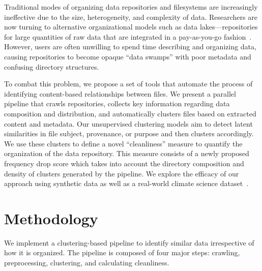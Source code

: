 \documentclass[sigconf,screen]{acmart}
\begin{document}
Traditional modes of organizing data repositories and filesystems are increasingly ineffective due to the size, heterogeneity, and complexity of data. Researchers are now turning to alternative organizational models such as data lakes---repositories for large quantities of raw data that are integrated in a pay-as-you-go fashion~\cite{jeffery2008pay, madhavan2007web}. However, users are often unwilling to spend time describing and organizing data, causing repositories to become opaque ``data swamps''\cite{hai2016constance} with poor metadata and confusing directory structures. 


To combat this problem, we propose a set of tools that automate the process of identifying content-based relationships between files. We present a parallel pipeline that crawls repositories, collects key information regarding data composition and distribution, and automatically clusters files based on extracted content and metadata. Our unsupervised clustering models aim to detect latent similarities in file subject, provenance, or purpose \cite{brackenbury2018} and then clusters accordingly. We use these clusters to define a novel ``cleanliness'' measure to quantify the organization of the data repository. This measure consists of a newly proposed frequency drop score which takes into account the directory composition and density of clusters generated by the pipeline. We explore the efficacy of our approach using synthetic data as well as a real-world climate science dataset~\cite{CDIAC}. 

\section{Methodology}

We implement a clustering-based pipeline to identify similar data irrespective of how it is organized. The pipeline is composed of four major steps:  crawling, preprocessing, clustering, and calculating cleanliness.
\end{document}
